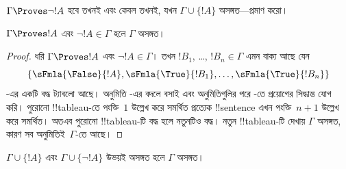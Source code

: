 \documentclass[../../../include/open-logic-section]{subfiles}
\begin{document}
\begin{prob}
$\Gamma \Proves \lnot !A$ হবে তখনই এবং কেবল তখনই, যখন
$\Gamma \cup \{!A\}$ অসঙ্গত—প্রমাণ করো।
\end{prob}

\begin{prop}
  $\Gamma \Proves !A$ এবং $\lnot !A \in \Gamma$ হলে $\Gamma$ অসঙ্গত।
\end{prop}

\begin{proof}
  ধরি $\Gamma \Proves !A$ এবং $\lnot !A \in \Gamma$। তখন
  $!B_1$, \dots, $!B_n\in\Gamma$ এমন বাক্য আছে যেন
  \[
  \{\sFmla{\False}{!A}, \sFmla{\True}{!B_1}, \dots, \sFmla{\True}{!B_n}\}
  \]
-এর একটি বদ্ধ ট্যাবলো আছে। অনুমিতি -এর বদলে
   বসাই এবং অনুমিতিগুলির পরে
  -তে \TRule{\True}{\lnot} প্রয়োগের সিদ্ধান্ত
  যোগ করি। পুরোনো !!{tableau}-তে পংক্তি~$1$ উল্লেখ করে সমর্থিত
  প্রত্যেক !!{sentence} এখন পংক্তি~$n+1$ উল্লেখ করে সমর্থিত। অতএব
  পুরোনো !!{tableau}-টি বদ্ধ হলে নতুনটিও বদ্ধ। নতুন !!{tableau}-টি দেখায়
  $\Gamma$ অসঙ্গত, কারণ সব অনুমিতিই~$\Gamma$-তে আছে।
\end{proof}

\begin{prop}
  $\Gamma \cup \{!A\}$ এবং $\Gamma \cup \{\lnot !A\}$ উভয়ই
  অসঙ্গত হলে $\Gamma$ অসঙ্গত।
\end{prop}
\end{document}
